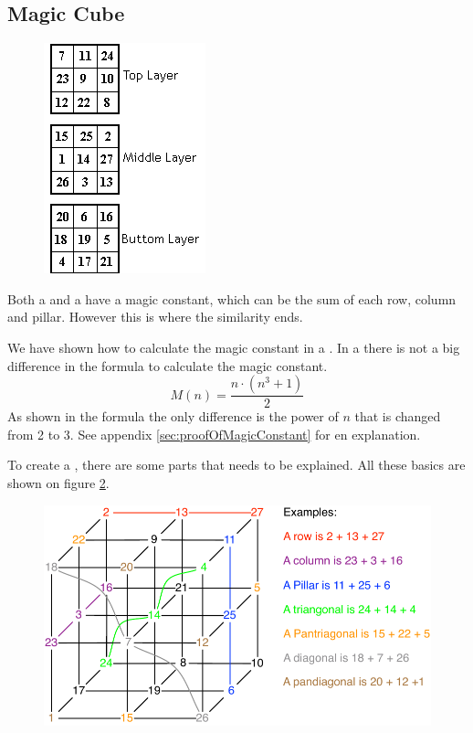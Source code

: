 \subsection{Magic Cube}

\begin{figure}[h]
	\centering
		\includegraphics[scale=0.8]{input/pics/presentMagicCube2}
	\caption{}
	\label{fig:presentMagicCube}
\end{figure}

Both a \msquare{} and a \mcube{} have a magic constant, which can be the sum of each row, column and pillar. However this is where the similarity ends.

We have shown how to calculate the magic constant in a \msquare{}.
In a  \mcube{} there is not a big difference in the formula to calculate the magic constant.
\begin{equation}
	M(n)=\frac{n \cdot (n^3+1)}{2}
\end{equation}
As shown in the formula the only difference is the power of $n$ that is changed from 2 to 3.
See appendix \ref{sec:proofOfMagicConstant} for en explanation.

To create a  \mcube{}, there are some parts that needs to be explained.
All these basics are shown on figure \ref{fig:cubeparts}.

\begin{figure}[h]
	\centering
		\includegraphics[scale=0.3]{input/pics/cubeparts}
	\caption{}
	\label{fig:cubeparts}
\end{figure}

